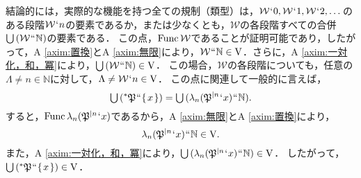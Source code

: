 \noindent 結論的には，実際的な機能を持つ全ての規制（類型）は，$ \mathcal{W}\fap 0,\mathcal{W}\fap 1,\mathcal{W}\fap 2,\dots $のある段階$ \mathcal{W}\fap n $の要素であるか，または少なくとも，$\mathcal{W}$の各段階すべての合併$ \union{(\mathcal{W}\img\mathbb{N})} $の要素である．
この点，$\func{\mathcal{W}}$であることが証明可能であり，したがって，A \ref{axim:置換}とA \ref{axim:無限}により，$ \mathcal{W}\img\mathbb{N}\in\univ $．さらに，A \ref{axim:一対化，和，冪}により，$\union{(\mathcal{W}\img\mathbb{N})}\in\univ$．
この場合，$\mathcal{W}$の各段階についても，任意の$\Lambda\neq n\in\mathbb{N}$に対して，$ \Lambda\neq \mathcal{W}\fap n\in\univ $．
この点に関連して一般的に言えば，
\[
    \union{(\ance{\mathfrak{P}}\img\classab{x})}= \union{(\lambda_n(\iter{\mathfrak{P}}{n}\fap x)\img\mathbb{N})}.
\]
すると，$ \func{\lambda_n(\iter{\mathfrak{P}}{n}\fap x)} $であるから，A \ref{axim:無限}とA \ref{axim:置換}により，
\[
    \lambda_n(\iter{\mathfrak{P}}{n}\fap x)\img\mathbb{N}\in\univ.
\]
また，A \ref{axim:一対化，和，冪}により，$ \union{(\lambda_n(\iter{\mathfrak{P}}{n}\fap x)\img\mathbb{N})}\in\univ $．
したがって，$ \union{(\ance{\mathfrak{P}}\img\classab{x})}\in\univ $．

